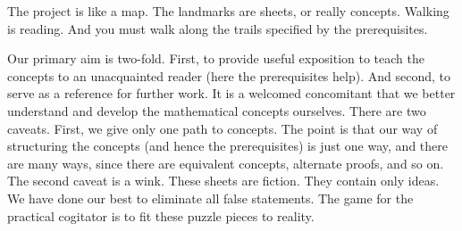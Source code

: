 
The project is like a map.
The landmarks are sheets, or really concepts.
Walking is reading.
And you must walk along the trails specified by the prerequisites.


Our primary aim is two-fold.
First, to provide useful exposition to teach the concepts to an unacquainted reader (here the prerequisites help).
And second, to serve as a reference for further work.
It is a welcomed concomitant that we better understand and develop the mathematical concepts ourselves.
%
There are two caveats.
First, we give only one path to concepts.
The point is that our way of structuring the concepts (and hence the prerequisites) is just one way, and there are many ways, since there are equivalent concepts, alternate proofs, and so on.
The second caveat is a wink.
These sheets are fiction.
They contain only ideas.
We have done our best to eliminate all false statements.
The game for the practical cogitator is to fit these puzzle pieces to reality.


